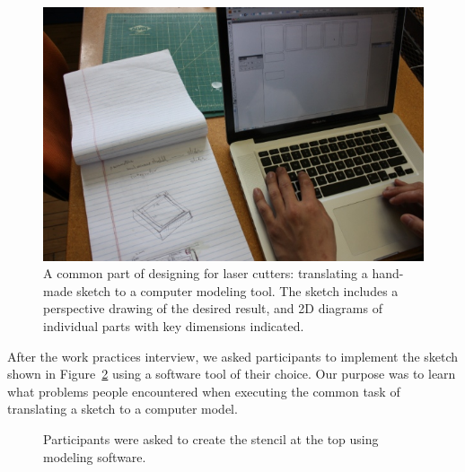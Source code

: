 \documentclass{article}
\begin{document}
\begin{figure}[h]
  \centering
  \includegraphics[width=0.9\linewidth]{img/translate-sketch-to-computer.jpg}
  \caption{A common part of designing for laser cutters: translating a
    hand-made sketch to a computer modeling tool. The sketch includes
    a perspective drawing of the desired result, and 2D diagrams of
    individual parts with key dimensions indicated.}
  \label{fig:translate}
\end{figure}

After the work practices interview, we asked participants to implement
the sketch shown in Figure~\ref{fig:interview-sketch} using a software
tool of their choice. Our purpose was to learn what problems
people encountered when executing the common task of translating a
sketch to a computer model.

\begin{figure}[h]
\centering 
{}

\caption{Participants were asked to create the stencil at the top
  using modeling software.}
\label{fig:interview-sketch}
\end{figure}
\end{document}
